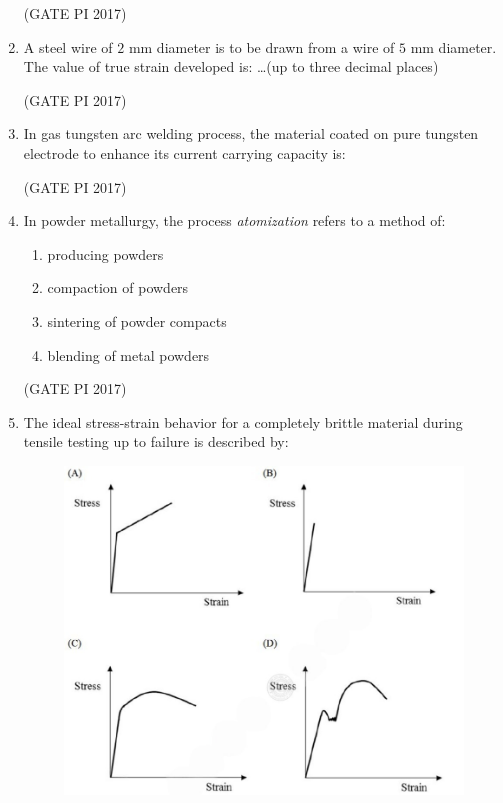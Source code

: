 \documentclass[journal,12pt,onecolumn]{IEEEtran}
\theoremstyle{remark}
\begin{document}
\begin{enumerate}
\hfill (GATE PI 2017)

\item A steel wire of $2$ mm diameter is to be drawn from a wire of $5$ mm diameter.  
The value of true strain developed is:  
\dots (up to three decimal places)  

\hfill (GATE PI 2017)

\item In gas tungsten arc welding process, the material coated on pure tungsten electrode  
to enhance its current carrying capacity is:
\begin{enumerate}
\end{enumerate}

\hfill (GATE PI 2017)

\item In powder metallurgy, the process \textit{atomization} refers to a method of:
\begin{enumerate}
\item producing powders
\item compaction of powders
\item sintering of powder compacts
\item blending of metal powders
\end{enumerate}

\hfill (GATE PI 2017)

\item The ideal stress\--strain behavior for a completely brittle material during tensile testing up to failure is described by:
\begin{figure}[H]
    \centering
    \includegraphics[width=1\columnwidth]{fig2.png}
    \caption{}
    \label{fig:placeholder}
\end{figure}


\end{enumerate}
\end{document}
